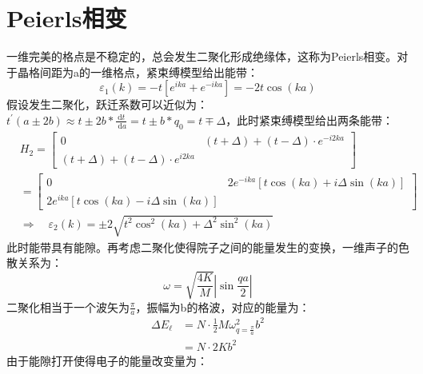 \documentclass[12pt, a4paper, oneside]{ctexbook}
\begin{document}
\section{Peierls相变}
一维完美的格点是不稳定的，总会发生二聚化形成绝缘体，这称为Peierls相变。对于晶格间距为a的一维格点，紧束缚模型给出能带：
\begin{equation}
	\varepsilon_1(k)=-t\left[e^{i k a}+e^{-i k a}\right]=-2 t \cos (k a)
\end{equation}
假设发生二聚化，跃迁系数可以近似为：$ t^{\prime}(a \pm 2 b) \approx t \pm 2 b * \frac{\mathrm{d} t}{\mathrm{~d} a}=t \pm b * q_0=t \mp \Delta $，此时紧束缚模型给出两条能带：
\begin{equation}
	\begin{aligned}
		& H_2= {\left[\begin{array}{cc}
		0 & (t+\Delta)+(t-\Delta) \cdot e^{-i 2 k a} \\
		(t+\Delta)+(t-\Delta) \cdot e^{i 2 k a}
		\end{array}\right] } \\
		&= {\left[\begin{array}{cc}
		0 & 2 e^{-i k a}[t \cos (k a)+i \Delta \sin (k a)] \\
		2 e^{i k a}[t \cos (k a)-i \Delta \sin (k a)]
		\end{array}\right] } \\
		& \Rightarrow \quad \varepsilon_2(k)= \pm 2 \sqrt{t^2 \cos ^2(k a)+\Delta^2 \sin ^2(k a)}
		\end{aligned}
\end{equation} 
此时能带具有能隙。再考虑二聚化使得院子之间的能量发生的变换，一维声子的色散关系为：
\begin{equation}
	\omega=\sqrt{\frac{4 K}{M}}\left|\sin \frac{q a}{2}\right|
\end{equation}
二聚化相当于一个波矢为$ \frac{\pi}{a} $，振幅为b的格波，对应的能量为：
\begin{equation}
	\begin{aligned}
		\Delta E_{\ell} & =N \cdot \frac{1}{2} M \omega_{q=\frac{\pi}{a}}^2 b^2 \\
		& =N \cdot 2 K b^2
		\end{aligned}
\end{equation} 
由于能隙打开使得电子的能量改变量为：
\end{document}
